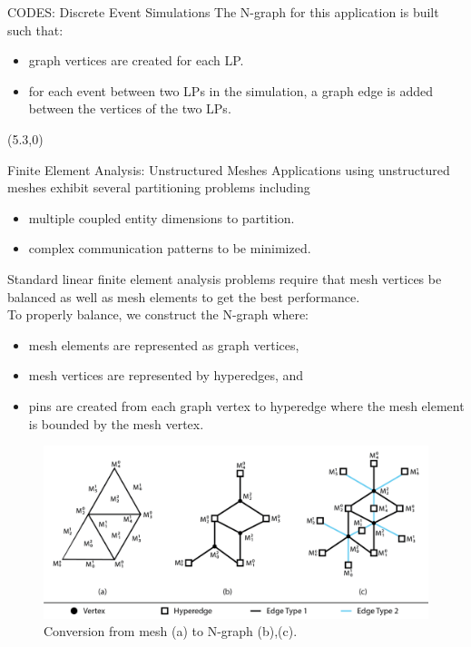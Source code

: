 \documentclass{beamer}
\begin{document}
\begin{textblock}{15.6}
\begin{textblock}{5}
\begin{block}{\centering CODES: Discrete Event Simulations}
      The N-graph for this application is built such that:
      \begin{itemize}
      \item graph vertices are created for each LP.
      \item for each event between two LPs in the simulation, a graph edge is added between the vertices of the two LPs.
      \end{itemize}
    \end{block}
  \end{textblock}
  \begin{textblock}{5}(5.3,0)
    \begin{block}{\centering Finite Element Analysis: Unstructured Meshes}
      Applications using unstructured meshes exhibit several partitioning problems including
      \begin{itemize}
      \item multiple coupled entity dimensions to partition.
      \item complex communication patterns to be minimized.
      \end{itemize}
      Standard linear finite element analysis problems require that mesh vertices be balanced as well as mesh elements to get the best performance.\\
      To properly balance, we construct the N-graph where:
      \begin{itemize}
      \item mesh elements are represented as graph vertices,
      \item mesh vertices are represented by hyperedges, and
      \item pins are created from each graph vertex to hyperedge where the mesh element is bounded by the mesh vertex.
      \end{itemize}
      \begin{figure}
        \centering
        \includegraphics[width=.7\textwidth]{../figures/exampleMesh2Graph_backgroundless.png}
        \caption{Conversion from mesh (a) to N-graph (b),(c).}

\end{figure}
\end{block}
\end{textblock}
\end{textblock}
\end{document}
